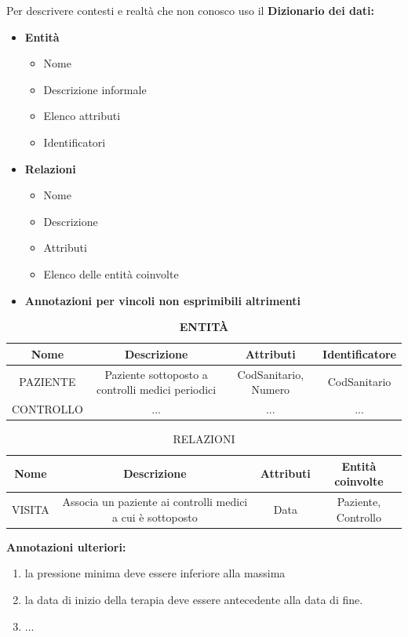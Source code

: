 \documentclass{article}
\newcommand{\sitemize}[1]{%
  \begin{itemize}[label=$\diamond$]
    #1
  \end{itemize}
}
\begin{document}
Per descrivere contesti e realtà che non conosco uso il
\textbf{Dizionario dei dati:}
\begin{itemize}
	\item \textbf{Entità} \sitemize{
		\item Nome
		\item Descrizione informale
		\item Elenco attributi
		\item Identificatori
	}
	\item \textbf{Relazioni} \sitemize{
	\item Nome
	\item Descrizione
	\item Attributi
	\item Elenco delle entità coinvolte
	}
	\item\textbf{ Annotazioni per vincoli non esprimibili altrimenti}
\end{itemize}

\begin{table}[h!]
\centering
\caption{\textbf{ENTITÀ}}
\begin{tabular}{|c|c|c|c|}
	\hline
	\textbf{Nome} & \textbf{Descrizione} & \textbf{Attributi} & \textbf{Identificatore}\\
	\hline
	PAZIENTE & Paziente sottoposto a controlli medici periodici &  CodSanitario, Numero & CodSanitario \\
	\hline
	CONTROLLO & ... & ... & ... \\
	\hline
\end{tabular}

\end{table}

\begin{table}[h!]
	\centering
	\caption{RELAZIONI}
	\begin{tabular}{|c|c|c|c|}
		\hline
		\textbf{Nome} & \textbf{Descrizione} & \textbf{Attributi} & \textbf{Entità coinvolte}\\
		\hline
		VISITA & Associa un paziente ai controlli medici a cui è sottoposto & Data & Paziente, Controllo \\
		\hline
	\end{tabular}
\end{table}

\textbf{Annotazioni ulteriori:}\begin{enumerate}
	\item  la pressione minima deve essere inferiore alla massima 
	\item la data di inizio della terapia deve essere antecedente alla data di fine. 
	\item ...
\end{enumerate}
\end{document}

